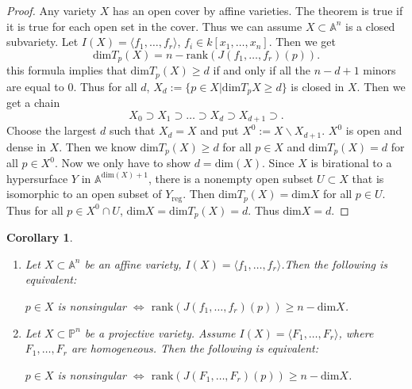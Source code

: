\documentclass{amsart}
\theoremstyle{plain}
\newtheorem{corollary}{Corollary}
\theoremstyle{definition}
\theoremstyle{remark}
\numberwithin{equation}{section}
\begin{document}
\begin{proof}
	Any variety $ X $ has an open cover by affine varieties. The theorem is true if it is true for each open set in the cover. Thus we can assume $ X\subset\mathbb{A}^n $ is a closed subvariety. Let $ I(X)=\langle f_1,\dots,f_r\rangle $, $ f_i\in k[x_1,\dots,x_n] $. Then we get 
	$$
	\mathrm{dim}T_p(X)= n- \mathrm{rank}(J(f_1,\dots,f_r)(p)).
	$$
	this formula implies that $ \mathrm{dim}T_p(X)\geq d $ if and only if all the $ n-d+1 $ minors are equal to $ 0 $.
	Thus for all $ d $, $ X_d:=\lbrace p\in X|\mathrm{dim}T_pX\geq d\rbrace $ is closed in $ X $. Then we get a chain
	$$
	X_0\supset X_1\supset \dots\supset X_d\supset X_{d+1}\supset.
	$$
	Choose the largest $ d $ such that $ X_d=X $ and put $ X^0:=X\backslash X_{d+1} $. $ X^0 $ is open and dense in $ X $. Then we know $ \mathrm{dim}T_p(X)\geq d $ for all $ p\in X $ and $ \mathrm{dim}T_p(X)=d $ for all $ p\in X^0 $. Now we only have to show $ d=\mathrm{dim}(X) $. Since $ X $ is birational to a hypersurface $ Y $ in $ \mathbb{A}^{\mathrm{dim}(X)+1} $, there is a nonempty open subset $ U\subset X $ that is isomorphic to an open subset of $ Y_{\mathrm{reg}} $. Then $ \mathrm{dim}T_p(X)=\mathrm{dim}X $ for all $ p\in U $. Thus for all $ p\in X^0\cap U $, $ \mathrm{dim}X=\mathrm{dim}T_p(X)=d $. Thus $ \mathrm{dim}X=d $.
\end{proof}
\begin{corollary}
	\begin{enumerate}
		\item Let $ X\subset\mathbb{A}^n $ be an affine variety, $ I(X)=\langle f_1,\dots,f_r\rangle $.Then the following is equivalent:
		\begin{center}
			$ p\in X $ is nonsingular $ \Leftrightarrow $ $ \mathrm{rank}(J(f_1,\dots,f_r)(p))\geq n-\mathrm{dim}X $.
		\end{center}
		\item Let $ X\subset\mathbb{P}^n $ be a projective variety. Assume $ I(X)=\langle F_1,\dots,F_r\rangle $, where $ F_1,\dots,F_r $ are homogeneous. Then the following is equivalent:
		\begin{center}
			$ p\in X $ is nonsingular $ \Leftrightarrow $ $ \mathrm{rank}(J(F_1,\dots,F_r)(p))\geq n-\mathrm{dim}X $.
		\end{center}
	\end{enumerate}
\end{corollary}
\end{document}
